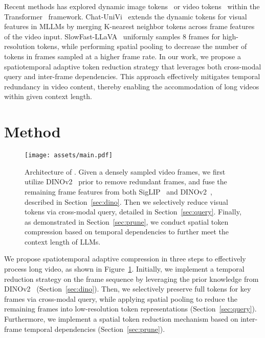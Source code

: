 Recent methods has explored dynamic image tokens~\citep{ma2023image,xu2022groupvit,bolya2022token} or video tokens~\citep{lee2024multi,ren2023testa,choi2024vid} within the Transformer~\citep{vaswani2017attention} framework. Chat-UniVi~\citep{jin2023chatunivi} extends the dynamic tokens for visual features in MLLMs by merging K-nearest neighbor tokens across frame features of the video input. SlowFast-LLaVA~\citep{xu2024slowfast} uniformly samples 8 frames for high-resolution tokens, while performing spatial pooling to decrease the number of tokens in frames sampled at a higher frame rate. In our work, we propose a spatiotemporal adaptive token reduction strategy that leverages both cross-modal query and inter-frame dependencies. This approach effectively mitigates temporal redundancy in video content, thereby enabling the accommodation of long videos within given context length.\section{Method}

\begin{figure}
    \centering
    \texttt{[image: assets/main.pdf]}
    \caption{Architecture of \modelname. Given a densely sampled video frames, we first utilize DINOv2~\citep{oquab2023dinov2} prior to remove redundant frames, and fuse the remaining frame features from both SigLIP~\citep{zhai2023sigmoid} and DINOv2~\citep{oquab2023dinov2}, described in Section~\ref{sec:dino}. Then we selectively reduce visual tokens via cross-modal query, detailed in Section~\ref{sec:query}. Finally, as demonstrated in Section~\ref{sec:prune}, we conduct spatial token compression based on temporal dependencies to further meet the context length of LLMs.}
    \label{fig:main}
\end{figure}

We propose spatiotemporal adaptive compression in three steps to effectively process long video, as shown in Figure~\ref{fig:main}. Initially, we implement a temporal reduction strategy on the frame sequence by leveraging the prior knowledge from DINOv2~\citep{oquab2023dinov2} (Section~\ref{sec:dino}). Then, we selectively preserve full tokens for key frames via cross-modal query, while applying spatial pooling to reduce the remaining frames into low-resolution token representations (Section~\ref{sec:query}). Furthermore, we implement a spatial token reduction mechanism based on inter-frame temporal dependencies (Section~\ref{sec:prune}).

